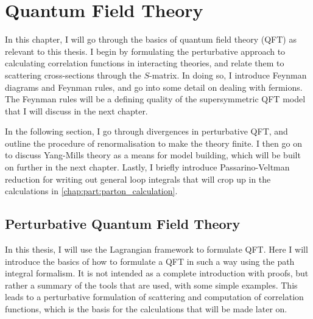 \documentclass[../main.tex]{subfiles}
\begin{document}
\chapter{Quantum Field Theory}
\label{chap:qft}
In this chapter, I will go through the basics of quantum field theory (QFT) as relevant to this thesis.
I begin by formulating the perturbative approach to calculating correlation functions in interacting theories, and relate them to scattering cross-sections through the \(S\)-matrix.
In doing so, I introduce Feynman diagrams and Feynman rules, and go into some detail on dealing with fermions.
The Feynman rules will be a defining quality of the supersymmetric QFT model that I will discuss in the next chapter.

In the following section, I go through divergences in perturbative QFT, and outline the procedure of renormalisation to make the theory finite.
I then go on to discuss Yang-Mills theory as a means for model building, which will be built on further in the next chapter.
Lastly, I briefly introduce Passarino-Veltman reduction for writing out general loop integrals that will crop up in the calculations in \cref{chap:part:parton_calculation}.





\section{Perturbative Quantum Field Theory}
In this thesis, I will use the Lagrangian framework to formulate QFT\@.
Here I will introduce the basics of how to formulate a QFT in such a way using the path integral formalism.
It is not intended as a complete introduction with proofs, but rather a summary of the tools that are used, with some simple examples.
This leads to a perturbative formulation of scattering and computation of correlation functions, which is the basis for the calculations that will be made later on.
\end{document}
